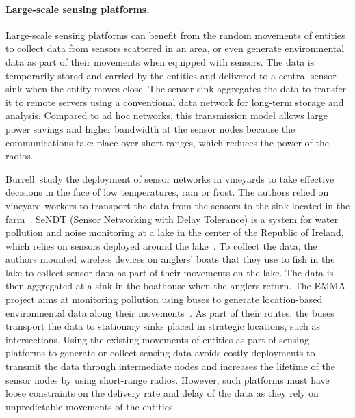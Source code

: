 \paragraph{Large-scale sensing platforms.}
Large-scale sensing platforms can benefit from the random movements of entities to collect data from sensors scattered in an area, or even generate environmental data as part of their movements when equipped with sensors. The data is temporarily stored and carried by the entities and delivered to a central sensor sink when the entity moves close. The sensor sink aggregates the data to transfer it to remote servers using a conventional data network for long-term storage and analysis. Compared to ad hoc networks, this transmission model allows large power savings and higher bandwidth at the sensor nodes because the communications take place over short ranges, which reduces the power of the radios. 

Burrell~\etal study the deployment of sensor networks in vineyards to take effective decisions in the face of low temperatures, rain or frost. The authors relied on vineyard workers to transport the data from the sensors to the sink located in the farm~\cite{burrell2004vineyard}. SeNDT (Sensor Networking with Delay Tolerance) is a system for water pollution and noise monitoring at a lake in the center of the Republic of Ireland, which relies on sensors deployed around the lake~\cite{mcdonald2007sensor}. To collect the data, the authors mounted wireless devices on anglers' boats that they use to fish in the lake to collect sensor data as part of their movements on the lake. The data is then aggregated at a sink in the boathouse when the anglers return. The EMMA project aims at monitoring pollution using buses to generate location-based environmental data along their movements~\cite{lahde2007practical}. As part of their routes, the buses transport the data to stationary sinks placed in strategic locations, such as intersections. Using the existing movements of entities as part of sensing platforms to generate or collect sensing data avoids costly deployments to transmit the data through intermediate nodes and increases the lifetime of the sensor nodes by using short-range radios. However, such platforms must have loose constraints on the delivery rate and delay of the data as they rely on unpredictable movements of the entities.

